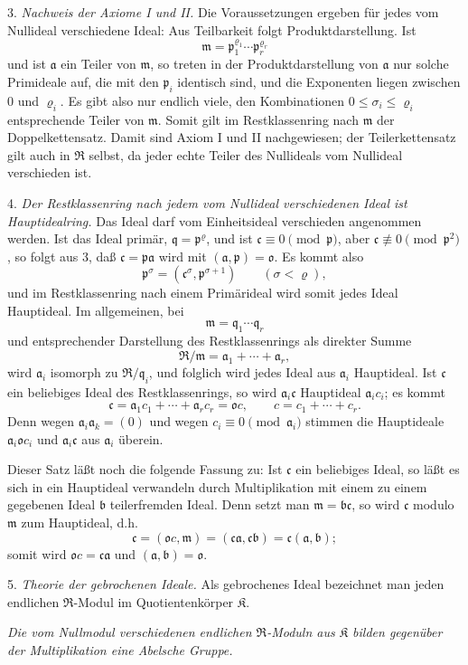 \documentclass[11pt]{article}
\providecommand{\mR}{\mathfrak{R}}
\providecommand{\mK}{\mathfrak{K}}
\providecommand{\ma}{\mathfrak{a}}
\providecommand{\mb}{\mathfrak{b}}
\providecommand{\mc}{\mathfrak{c}}
\providecommand{\mm}{\mathfrak{m}}
\providecommand{\mo}{\mathfrak{o}}
\providecommand{\mpideal}{\mathfrak{p}}
\providecommand{\mq}{\mathfrak{q}}
\begin{document}
3. \emph{Nachweis der Axiome I und II.} Die Voraussetzungen ergeben für jedes vom Nullideal verschiedene Ideal: Aus Teilbarkeit folgt Produktdarstellung. Ist
\[
        \mm=\mpideal_1^{\varrho_1}\cdots\mpideal_r^{\varrho_r}
\]
und ist $\ma$ ein Teiler von $\mm$, so treten in der Produktdarstellung von $\ma$ nur solche Primideale auf, die mit den $\mpideal_i$ identisch sind, und die Exponenten liegen zwischen $0$ und $\varrho_i$. Es gibt also nur endlich viele, den Kombinationen $0\le\sigma_i\le\varrho_i$ entsprechende Teiler von $\mm$. Somit gilt im Restklassenring nach $\mm$ der Doppelkettensatz. Damit sind Axiom I und II nachgewiesen; der Teilerkettensatz gilt auch in $\mR$ selbst, da jeder echte Teiler des Nullideals vom Nullideal verschieden ist.

4. \emph{Der Restklassenring nach jedem vom Nullideal verschiedenen Ideal ist Hauptidealring.} Das Ideal darf vom Einheitsideal verschieden angenommen werden. Ist das Ideal primär, $\mq=\mpideal^\varrho$, und ist $\mc\equiv0\pmod{\mpideal}$, aber $\mc\not\equiv0\pmod{\mpideal^2}$, so folgt aus 3, daß $\mc=\mpideal\ma$ wird mit $(\ma,\mpideal)=\mo$. Es kommt also
\[
        \mpideal^\sigma=(\mc^\sigma,\mpideal^{\sigma+1})
        \qquad(\sigma<\varrho),
\]
und im Restklassenring nach einem Primärideal wird somit jedes Ideal Hauptideal. Im allgemeinen, bei
\[
        \mm=\mq_1\cdots\mq_r
\]
und entsprechender Darstellung des Restklassenrings als direkter Summe
\[
        \mR/\mm=\ma_1+\cdots+\ma_r,
\]
wird $\ma_i$ isomorph zu $\mR/\mq_i$, und folglich wird jedes Ideal aus $\ma_i$ Hauptideal. Ist $\mc$ ein beliebiges Ideal des Restklassenrings, so wird $\ma_i\mc$ Hauptideal $\ma_i c_i$; es kommt
\[
        \mc=\ma_1c_1+\cdots+\ma_r c_r=\mo c,
        \qquad c=c_1+\cdots+c_r.
\]
Denn wegen $\ma_i\ma_k=(0)$ und wegen $c_i\equiv0\pmod{\ma_i}$ stimmen die Hauptideale $\ma_i\mo c_i$ und $\ma_i\mc$ aus $\ma_i$ überein.

Dieser Satz läßt noch die folgende Fassung zu: Ist $\mc$ ein beliebiges Ideal, so läßt es sich in ein Hauptideal verwandeln durch Multiplikation mit einem zu einem gegebenen Ideal $\mb$ teilerfremden Ideal. Denn setzt man $\mm=\mb\mc$, so wird $\mc$ modulo $\mm$ zum Hauptideal, d.h.
\[
        \mc=(\mo c,\mm)=(\mc\ma,\mc\mb)=\mc(\ma,\mb);
\]
somit wird $\mo c=\mc\ma$ und $(\ma,\mb)=\mo$.

5. \emph{Theorie der gebrochenen Ideale.} Als gebrochenes Ideal bezeichnet man jeden endlichen $\mR$-Modul im Quotientenkörper $\mK$.

\emph{Die vom Nullmodul verschiedenen endlichen $\mR$-Moduln aus $\mK$ bilden gegenüber der Multiplikation eine Abelsche Gruppe.}
\end{document}
